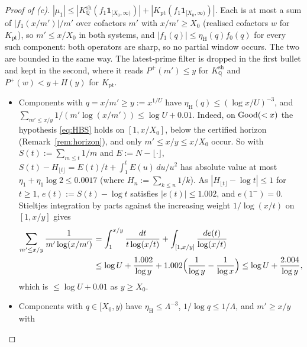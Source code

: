 \begin{proof}[Proof of (c)]
$|\mu_1|\le|K^{\mathrm{sh}}_{\mathbb Q}(f_1\mathbf 1_{[X_0,\infty)})|+|K_{\mathrm{pt}}(f_1\mathbf 1_{[X_0,\infty)})|$. Each is at most a
sum of $|f_1(x/m')|/m'$ over cofactors $m'$ with $x/m'\ge X_0$ (realised cofactors $w$ for $K_{\mathrm{pt}}$), so $m'\le x/X_0$ in
both systems, and $|f_1(q)|\le\eta_{\mathrm H}(q)f_0(q)$ for every such component: both operators are sharp, so no partial window
occurs. The two are bounded in the same way. The latest-prime filter is dropped in the first bullet and kept in the second, where
it reads $P^+(m')\le y$ for $K^{\mathrm{sh}}_{\mathbb Q}$ and $P^+(w)<y+H(y)$ for $K_{\mathrm{pt}}$.
\begin{itemize}
\item Components with $q=x/m'\ge y:=x^{1/U}$ have $\eta_{\mathrm H}(q)\le(\log x/U)^{-3}$, and
$\sum_{m'\le x/y}1/(m'\log(x/m'))\le\log U+0.01$.
  Indeed, on $\mathrm{Good}(<x)$ the hypothesis \eqref{eq:HBS} holds on $[1,x/X_0]$, below the certified horizon (Remark~\ref{rem:horizon}),
  and only $m'\le x/y\le x/X_0$ occur. So with $S(t):=\sum_{m\le t}1/m$ and $E:=N-\lfloor\cdot\rfloor$,
  $S(t)-H_{\lfloor t\rfloor}=E(t)/t+\int_1^tE(u)\,du/u^2$ has absolute value at most $\eta_1+\eta_1\log2\le0.0017$ (where
  $H_n:=\sum_{k\le n}1/k$). As $|H_{\lfloor t\rfloor}-\log t|\le1$ for $t\ge1$, $e(t):=S(t)-\log t$ satisfies $|e(t)|\le1.002$, and
  $e(1^-)=0$. Stieltjes integration by parts against the increasing weight $1/\log(x/t)$ on $[1,x/y]$ gives
  \begin{align*}
    \sum_{m'\le x/y}\frac1{m'\log(x/m')}&=\int_1^{x/y}\frac{dt}{t\log(x/t)}+\int_{[1,x/y]}\frac{de(t)}{\log(x/t)}\\
    &\le\log U+\frac{1.002}{\log y}+1.002\Bigl(\frac1{\log y}-\frac1{\log x}\Bigr)\le\log U+\frac{2.004}{\log y},
  \end{align*}
  which is $\le\log U+0.01$ as $y\ge X_0$.
\item Components with $q\in[X_0,y)$ have $\eta_{\mathrm H}\le\Lambda^{-3}$, $1/\log q\le1/\Lambda$, and $m'\ge x/y$ with

\end{itemize}
\end{proof}
